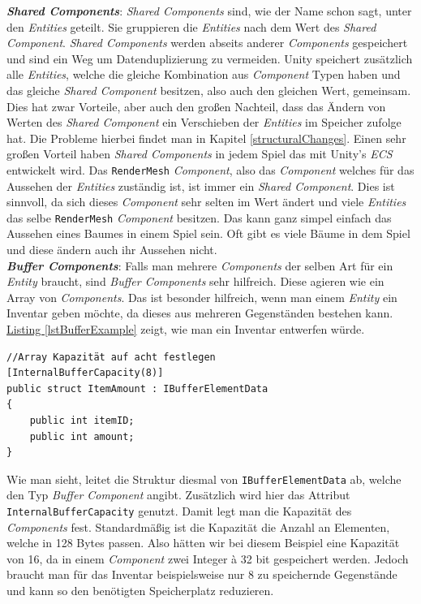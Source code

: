 \textbf{\textit{Shared Components}}: \textit{Shared Components} sind, wie der Name schon sagt, unter den \textit{Entities} geteilt. Sie gruppieren die \textit{Entities} nach dem Wert des \textit{Shared Component}. \textit{Shared Components} werden abseits anderer \textit{Components} gespeichert und sind ein Weg um Datenduplizierung zu vermeiden. Unity speichert zusätzlich alle \textit{Entities}, welche die gleiche Kombination aus \textit{Component} Typen haben und das gleiche \textit{Shared Component} besitzen, also auch den gleichen Wert, gemeinsam. Dies hat zwar Vorteile, aber auch den großen Nachteil, dass das Ändern von Werten des \textit{Shared Component} ein Verschieben der \textit{Entities} im Speicher zufolge hat. Die Probleme hierbei findet man in Kapitel \ref{structuralChanges}. Einen sehr großen Vorteil haben \textit{Shared Components} in jedem Spiel das mit Unity's \textit{ECS} entwickelt wird. Das \texttt{RenderMesh} \textit{Component}, also das \textit{Component} welches für das Aussehen der \textit{Entities} zuständig ist, ist immer ein \textit{Shared Component}. Dies ist sinnvoll, da sich dieses \textit{Component} sehr selten im Wert ändert und viele \textit{Entities} das selbe \texttt{RenderMesh} \textit{Component} besitzen. Das kann ganz simpel einfach das Aussehen eines Baumes in einem Spiel sein. Oft gibt es viele Bäume in dem Spiel und diese ändern auch ihr Aussehen nicht.\\
\textbf{\textit{Buffer Components}}: Falls man mehrere \textit{Components} der selben Art für ein \textit{Entity} braucht, sind \textit{Buffer Components} sehr hilfreich. Diese agieren wie ein Array von \textit{Components}. Das ist besonder hilfreich, wenn man einem \textit{Entity} ein Inventar geben möchte, da dieses aus mehreren Gegenständen bestehen kann. \hyperref[lstBufferExample]{Listing \ref*{lstBufferExample}} zeigt, wie man ein Inventar entwerfen würde.
\begin{lstlisting}[style=code, caption={[Beispiel eines \textit{Buffer Components}]Beispiel eines \textit{Buffer Components}. Das \textit{Buffer Component} stellt ein Inventar dar, welches verschiedene Items mit ihrer Anzahl speichert. Das Array ist maximal acht Elemente groß.}, label=lstBufferExample]
//Array Kapazität auf acht festlegen
[InternalBufferCapacity(8)]
public struct ItemAmount : IBufferElementData
{
    public int itemID;
    public int amount;
}
\end{lstlisting}
Wie man sieht, leitet die Struktur diesmal von \texttt{IBufferElementData} ab, welche den Typ \textit{Buffer Component} angibt. Zusätzlich wird hier das Attribut \texttt{InternalBufferCapacity} genutzt. Damit legt man die Kapazität des \textit{Components} fest. Standardmäßig ist die Kapazität die Anzahl an Elementen, welche in 128 Bytes passen. Also hätten wir bei diesem Beispiel eine Kapazität von 16, da in einem \textit{Component} zwei Integer à 32 bit gespeichert werden. Jedoch braucht man für das Inventar beispielsweise nur 8 zu speichernde Gegenstände und kann so den benötigten Speicherplatz reduzieren.
